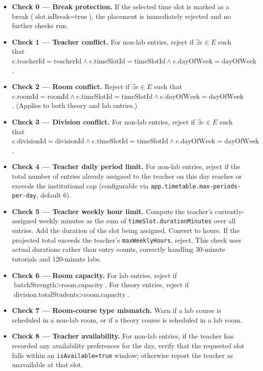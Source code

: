 \begin{itemize}
    \item \textbf{Check 0 --- Break protection.} If the selected time slot is marked as a break ($\text{slot.isBreak} = \text{true}$), the placement is immediately rejected and no further checks run.
    \item \textbf{Check 1 --- Teacher conflict.} For non-lab entries, reject if $\exists e \in E$ such that $e.\text{teacherId} = \text{teacherId} \wedge e.\text{timeSlotId} = \text{timeSlotId} \wedge e.\text{dayOfWeek} = \text{dayOfWeek}$.
    \item \textbf{Check 2 --- Room conflict.} Reject if $\exists e \in E$ such that $e.\text{roomId} = \text{roomId} \wedge e.\text{timeSlotId} = \text{timeSlotId} \wedge e.\text{dayOfWeek} = \text{dayOfWeek}$. (Applies to both theory and lab entries.)
    \item \textbf{Check 3 --- Division conflict.} For non-lab entries, reject if $\exists e \in E$ such that $e.\text{divisionId} = \text{divisionId} \wedge e.\text{timeSlotId} = \text{timeSlotId} \wedge e.\text{dayOfWeek} = \text{dayOfWeek}$.
    \item \textbf{Check 4 --- Teacher daily period limit.} For non-lab entries, reject if the total number of entries already assigned to the teacher on this day reaches or exceeds the institutional cap (configurable via \texttt{app.timetable.max-periods-per-day}, default 6).
    \item \textbf{Check 5 --- Teacher weekly hour limit.} Compute the teacher's currently-assigned weekly minutes as the sum of \texttt{timeSlot.durationMinutes} over all entries. Add the duration of the slot being assigned. Convert to hours. If the projected total exceeds the teacher's \texttt{maxWeeklyHours}, reject. This check uses actual durations rather than entry counts, correctly handling 30-minute tutorials and 120-minute labs.
    \item \textbf{Check 6 --- Room capacity.} For lab entries, reject if $\text{batchStrength} > \text{room.capacity}$. For theory entries, reject if $\text{division.totalStudents} > \text{room.capacity}$.
    \item \textbf{Check 7 --- Room-course type mismatch.} Warn if a lab course is scheduled in a non-lab room, or if a theory course is scheduled in a lab room.
    \item \textbf{Check 8 --- Teacher availability.} For non-lab entries, if the teacher has recorded any availability preferences for the day, verify that the requested slot falls within an \texttt{isAvailable=true} window; otherwise report the teacher as unavailable at that slot.
\end{itemize}

